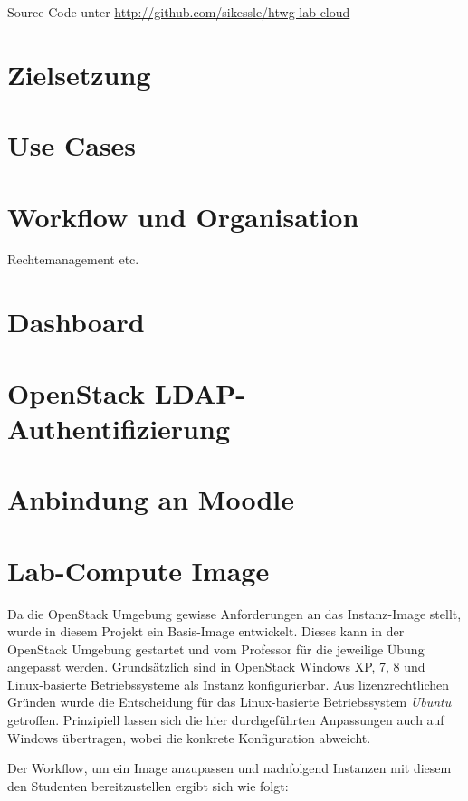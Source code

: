 Source-Code unter \url{http://github.com/sikessle/htwg-lab-cloud}

\section{Zielsetzung}

\section{Use Cases}

\section{Workflow und Organisation}

Rechtemanagement etc.

\section{Dashboard}

\section{OpenStack LDAP-Authentifizierung}

\section{Anbindung an Moodle}

\section{Lab-Compute Image}

Da die OpenStack Umgebung gewisse Anforderungen an das Instanz-Image stellt, wurde in diesem Projekt ein Basis-Image entwickelt. 
Dieses kann in der OpenStack Umgebung gestartet und vom Professor für die jeweilige Übung angepasst werden.
Grundsätzlich sind in OpenStack Windows XP, 7, 8 und Linux-basierte Betriebssysteme als Instanz konfigurierbar. 
Aus lizenzrechtlichen Gründen wurde die Entscheidung für das Linux-basierte Betriebssystem \emph{Ubuntu} getroffen. 
Prinzipiell lassen sich die hier durchgeführten Anpassungen auch auf Windows übertragen, wobei die konkrete Konfiguration abweicht.

Der Workflow, um ein Image anzupassen und nachfolgend Instanzen mit diesem den Studenten bereitzustellen ergibt sich wie folgt:


